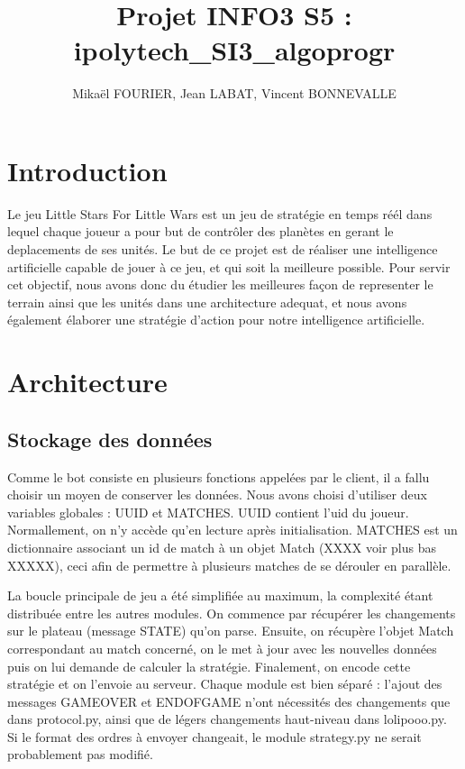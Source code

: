 \documentclass{rapport}
\title{Projet INFO3 S5 : ipolytech\_SI3\_algoprogr}
\author{%
	Mikaël FOURIER,
	Jean LABAT,
	Vincent BONNEVALLE
}
\date{}
\begin{document}
	\maketitle
	\tableofcontents
	\chapter*{Introduction}
Le jeu Little Stars For Little Wars est un jeu de stratégie en temps réél dans lequel chaque
joueur a pour but de contrôler des planètes en gerant le deplacements de ses unités.
Le but de ce projet est de réaliser une intelligence artificielle capable de jouer à ce jeu, et qui soit la meilleure possible.
Pour servir cet objectif, nous avons donc du étudier les meilleures façon de representer le terrain ainsi que les unités dans une architecture adequat,
et nous avons également élaborer une stratégie d'action pour notre intelligence artificielle.

	\chapter{Architecture}
		\section{Stockage des données}
Comme le bot consiste en plusieurs fonctions appelées par le client, il a fallu
choisir un moyen de conserver les données. Nous avons choisi d'utiliser deux
variables globales : UUID et MATCHES. UUID contient l'uid du joueur.
Normallement, on n'y accède qu'en lecture après initialisation. MATCHES est un
dictionnaire associant un id de match à un objet Match (XXXX voir plus bas
XXXXX), ceci afin de permettre à plusieurs matches de se dérouler en parallèle.

La boucle principale de jeu a été simplifiée au maximum, la complexité étant
distribuée entre les autres modules. On commence par récupérer les changements
sur le plateau (message STATE) qu'on parse. Ensuite, on récupère l'objet Match
correspondant au match concerné, on le met à jour avec les nouvelles données
puis on lui demande de calculer la stratégie. Finalement, on encode cette
stratégie et on l'envoie au serveur. Chaque module est bien séparé : l'ajout des
messages GAMEOVER et ENDOFGAME n'ont nécessités des changements que dans
protocol.py, ainsi que de légers changements haut-niveau dans lolipooo.py. Si le
format des ordres à envoyer changeait, le module strategy.py ne serait
probablement pas modifié.
\end{document}
